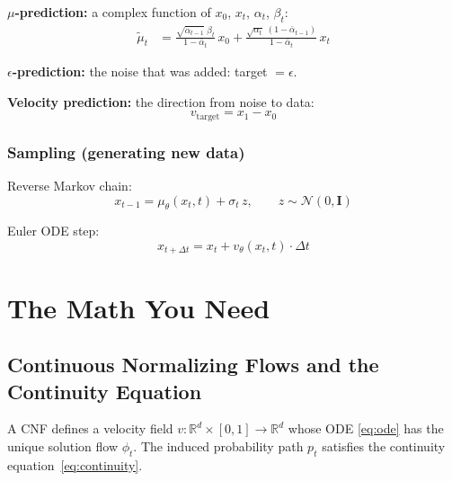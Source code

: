 \documentclass[11pt, a4paper]{article}
\newcommand{\vtheta}{v_\theta}
\newcommand{\mutheta}{\mu_\theta}
\newcommand{\mutilde}{\tilde{\mu}}
\newcommand{\alphabar}{\bar{\alpha}}
\newcommand{\R}{\mathbb{R}}
\newcommand{\N}{\mathcal{N}}
\newcommand{\Id}{\mathbf{I}}
\begin{document}
\begin{ddpmbox}
\vspace{-0.3em}
\textbf{$\mu$-prediction:} a complex function of $x_0$, $x_t$, $\alpha_t$, $\beta_t$:
\begin{align*}
  \mutilde_t
  &= \frac{\sqrt{\alphabar_{t-1}}\;\beta_t}{1 - \alphabar_t}\,x_0
  + \frac{\sqrt{\alpha_t}\;(1 - \alphabar_{t-1})}{1 - \alphabar_t}\,x_t
\end{align*}

\textbf{$\epsilon$-prediction:} the noise that was added: target $= \epsilon$.
\end{ddpmbox}

\begin{fmbox}
\vspace{-0.3em}
\textbf{Velocity prediction:} the direction from noise to data:
\[
  v_{\mathrm{target}} = x_1 - x_0
\]
\end{fmbox}

\subsubsection*{Sampling (generating new data)}

\begin{ddpmbox}
\vspace{-0.5em}
Reverse Markov chain:
\[
  x_{t-1} = \mutheta(x_t, t) + \sigma_t \, z,
  \qquad z \sim \N(0, \Id)
\]
\end{ddpmbox}

\begin{fmbox}
\vspace{-0.5em}
Euler ODE step:
\[
  x_{t + \Delta t} = x_t + \vtheta(x_t, t) \cdot \Delta t
\]
\end{fmbox}

\section{The Math You Need}
\label{sec:math}

\subsection{Continuous Normalizing Flows and the Continuity Equation}

A CNF defines a velocity field $v: \R^d \times [0,1] \to \R^d$ whose ODE
\eqref{eq:ode} has the unique solution flow $\phi_t$.  The induced probability
path $p_t$ satisfies the continuity equation~\eqref{eq:continuity}.
\end{document}
